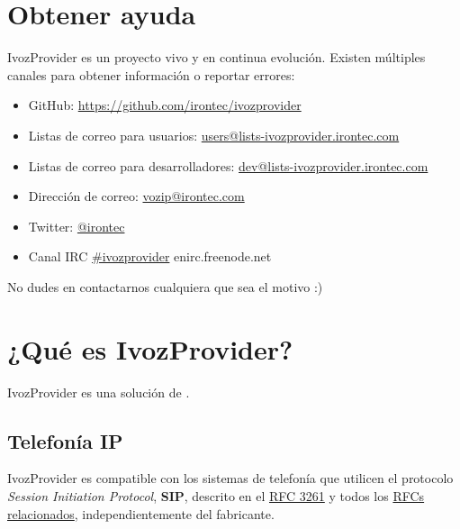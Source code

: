 \documentclass[letterpaper,10pt,spanish]{sphinxmanual}
\begin{document}
\section{Obtener ayuda}
\label{intro/getting_help:getting-help}\label{intro/getting_help::doc}\label{intro/getting_help:id1}
IvozProvider es un proyecto vivo y en continua evolución. Existen múltiples canales para obtener información o reportar errores:
\begin{itemize}
\item {} 
GitHub: \url{https://github.com/irontec/ivozprovider}

\item {} 
Listas de correo para usuarios: \href{mailto:users@lists-ivozprovider.irontec.com}{users@lists-ivozprovider.irontec.com}

\item {} 
Listas de correo para desarrolladores: \href{mailto:dev@lists-ivozprovider.irontec.com}{dev@lists-ivozprovider.irontec.com}

\item {} 
Dirección de correo: \href{mailto:vozip@irontec.com}{vozip@irontec.com}

\item {} 
Twitter: \href{https://twitter.com/irontec}{@irontec}

\item {} 
Canal IRC \href{https://webchat.freenode.net/?channels=ivozprovider}{\#ivozprovider} enirc.freenode.net

\end{itemize}

No dudes en contactarnos cualquiera que sea el motivo :)


\section{¿Qué es IvozProvider?}
\label{intro/what_is_ivozprovider::doc}\label{intro/what_is_ivozprovider:what-is-ivozprovider}
IvozProvider es una solución de {\hyperref[intro/what_is_ivozprovider:voip]{}} {\hyperref[intro/what_is_ivozprovider:multilevel]{}} {\hyperref[intro/what_is_ivozprovider:operator\string-oriented]{}} {\hyperref[intro/what_is_ivozprovider:exposed]{}}.


\subsection{Telefonía IP}
\label{intro/what_is_ivozprovider:ip-telephony}\label{intro/what_is_ivozprovider:voip}
IvozProvider es compatible con los sistemas de telefonía que utilicen el protocolo \emph{Session Initiation Protocol}, \textbf{SIP}, descrito en el \href{https://tools.ietf.org/html/rfc3261}{RFC 3261} y todos los \href{https://www.packetizer.com/ipmc/sip/standards.html}{RFCs relacionados}, independientemente del fabricante.
\end{document}
